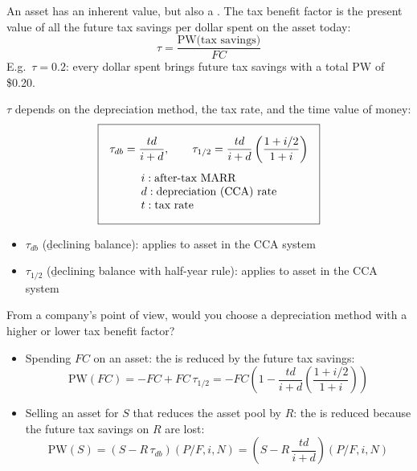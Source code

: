 
\begin{definition}
    An asset has an inherent value, but also a . The tax benefit factor is the present value of all the
    future tax savings per dollar spent on the asset today:
    \[\boxed{\tau = \frac{\text{PW(tax savings)}}{FC}}\]
    E.g.\ $\tau = 0.2$: every dollar spent brings future tax savings with a
    total PW of \$0.20.
\end{definition}

$\tau$ depends on the depreciation method, the tax rate, and the time value
of money:
\[\boxed{\begin{gathered}
    \tau_{db} = \frac{td}{i + d}, \qquad \tau_{1/2} = \frac{td}{i + d}\left(\frac{1 + i/2}{1 + i}\right)\\[4pt]
    \begin{array}{@{}l@{}}
        i: \text{after-tax MARR}\\
        d: \text{depreciation (CCA) rate}\\
        t: \text{tax rate}
    \end{array}
\end{gathered}}\]
\begin{itemize}
    \item $\tau_{db}$ (\b{declining balance}): applies to asset  in the CCA system
    \item $\tau_{1/2}$ (\b{declining balance with half-year rule}): applies to asset  in the CCA system
\end{itemize}

\begin{example}
    From a company's point of view, would you choose a depreciation method
    with a higher or lower tax benefit factor?
    \\
\end{example}

\begin{itemize}
    \item Spending $FC$ on an asset: the  is reduced by the future tax savings:
    \[\boxed{\text{PW}(FC) = -FC + FC\,\tau_{1/2} = -FC\left(1 - \frac{td}{i + d}\left(\frac{1 + i/2}{1 + i}\right)\right)}\]
    \item Selling an asset for $S$ that reduces the asset pool by $R$: the  is reduced because the future tax savings on $R$ are lost:
    \[\boxed{\text{PW}(S) = (S - R\,\tau_{db})(P/F,i,N) = \left(S - R\,\frac{td}{i + d}\right)(P/F,i,N)}\]
\end{itemize}

